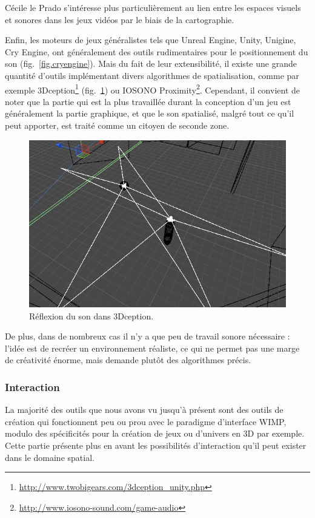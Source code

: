 \documentclass[french,12pt]{article}
\begin{document}
Cécile le Prado s'intéresse plus particulièrement au lien entre les espaces visuels et sonores dans les jeux vidéos\cite{le_prado_ecriture_2013} par le biais de la cartographie.

Enfin, les moteurs de jeux généralistes tels que Unreal Engine, Unity, Unigine, Cry Engine, ont généralement des outils rudimentaires pour le positionnement du son (fig.~\ref{fig.cryengine}). Mais du fait de leur extensibilité, il existe une grande quantité d'outils implémentant divers algorithmes de spatialisation, comme par exemple 3Dception\footnote{\url{http://www.twobigears.com/3dception_unity.php}} (fig.~\ref{fig.3Dception}) ou IOSONO Proximity\footnote{\url{http://www.iosono-sound.com/game-audio}}. Cependant, il convient de noter que la partie qui est la plus travaillée durant la conception d'un jeu est généralement la partie graphique, et que le son spatialisé, malgré tout ce qu'il peut apporter, est traité comme un citoyen de seconde zone.

\begin{figure}[h]
    \centering
    \includegraphics[scale=0.5]{images/3Dception.png}
    \caption{Réflexion du son dans 3Dception.}
    \label{fig.3Dception}
\end{figure}

De plus, dans de nombreux cas il n'y a que peu de travail sonore nécessaire : l'idée est de recréer un environnement réaliste, ce qui ne permet pas une marge de créativité énorme, mais demande plutôt des algorithmes précis.

\subsubsection{Interaction}
La majorité des outils que nous avons vu jusqu'à présent sont des outils de création qui fonctionnent peu ou prou avec le paradigme d'interface \ac{WIMP}, modulo des spécificités pour la création de jeux ou d'univers en 3D par exemple. Cette partie présente plus en avant les possibilités d'interaction qu'il peut exister dans le domaine spatial.
\end{document}
